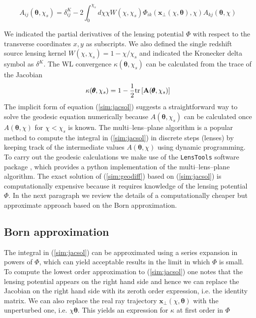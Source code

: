 \documentclass[reprint,aps,prd,superscriptaddress,showkeys,showpacs]{revtex4-1}
\newcommand{\bb}[1]{\mathbf{#1}}
\newcommand{\ttt}[1]{\texttt{#1}}
\newcommand\pt{\pmb{\theta}}
\begin{document}
\begin{widetext}
\begin{equation}
\label{sim:jacsol}
A_{ij}(\pt,\chi_s) = \delta^K_{ij}-2\int_0^{\chi_s} d\chi\chi W(\chi,\chi_s)\Phi_{ik}(\bb{x}_\perp(\chi,\pt),\chi)A_{kj}(\pt,\chi)
\end{equation} 
\end{widetext}
%
We indicated the partial derivatives of the lensing potential $\Phi$ with respect to the transverse coordinates $x,y$ as subscripts. We also defined the single redshift source lensing kernel $W(\chi,\chi_s)=1-\chi/\chi_s$ and indicated the Kronecker delta symbol as $\delta^K$. The WL convergence $\kappa(\pt,\chi_s)$ can be calculated from the trace of the Jacobian
\begin{equation}
\label{sim:trkappa}
\kappa(\pt,\chi_s) = 1-\frac{1}{2}{\rm tr}\left[\bb{A}(\pt,\chi_s)\right]
\end{equation}
%
The implicit form of equation (\ref{sim:jacsol}) suggests a straightforward way to solve the geodesic equation numerically because $A(\pt,\chi_s)$ can be calculated once $A(\pt,\chi)$ for $\chi<\chi_s$ is known. The multi--lens--plane algorithm \citep{RayTracingJain,RayTracingHartlap} is a popular method to compute the integral in (\ref{sim:jacsol}) in discrete steps (lenses) by keeping track of the intermediate values $A(\pt,\chi)$ using dynamic programming. To carry out the geodesic calculations we make use of the \ttt{LensTools} software package \citep{LensTools-paper}, which provides a {\sc python} implementation of the multi--lens--plane algorithm. The exact solution of (\ref{sim:geodiff}) based on (\ref{sim:jacsol}) is computationally expensive because it requires knowledge of the lensing potential $\Phi$. In the next paragraph we review the details of a computationally cheaper but approximate approach based on the Born approximation.     

\subsection{Born approximation}
The integral in (\ref{sim:jacsol}) can be approximated using a series expansion in powers of $\Phi$, which can yield acceptable results in the limit in which $\Phi$ is small. To compute the lowest order approximation to (\ref{sim:jacsol}) one notes that the lensing potential appears on the right hand side and hence we can replace the Jacobian on the right hand side with its zeroth order expression, i.e. the identity matrix. We can also replace the real ray trajectory $\bb{x}_\perp(\chi,\pt)$ with the unperturbed one, i.e. $\chi\pt$. This yields an expression for $\kappa$ at first order in $\Phi$
\end{document}
